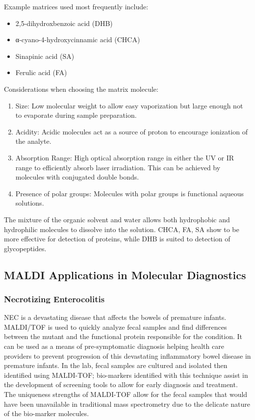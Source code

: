 \documentclass[letterpaper, 10 pt, conference]{ieeeconf}  %
\begin{document}
            Example matrices used most frequently include:
            \begin{itemize}
                \item{2,5-dihydroxbenzoic acid (DHB)}
                \item{α-cyano-4-hydroxycinnamic acid (CHCA)}
                \item{Sinapinic acid (SA)}
                \item{Ferulic acid (FA)}
            \end{itemize}
            Considerations when choosing the matrix molecule:
            \begin{enumerate}
                \item{Size: Low molecular weight to allow easy vaporization but large enough not to evaporate during sample preparation.}
                \item{Acidity: Acidic molecules act as a source of proton to encourage ionization   of the analyte.}
                \item{Absorption Range: High optical absorption range in either the UV or IR range  to efficiently absorb laser irradiation. This can be achieved by molecules     with conjugated double bonds.}
                \item{Presence of polar groups: Molecules with polar groups is functional aqueous solutions.}
            \end{enumerate}
            The mixture of the organic solvent and water allows both hydrophobic and hydrophilic molecules to dissolve into the solution. CHCA, FA, SA show to be more effective for detection of proteins, while DHB is suited to detection of glycopeptides.

        \subsection{\textbf{MALDI Applications in Molecular Diagnostics}}

            \subsubsection[\textbf{Nectrotizing Enterocolitits}]{\textbf{Necrotizing Enterocolitis}\autocite{R2}}\hfill \hfill

            NEC is a devastating disease that affects the bowels of premature infants. MALDI/TOF is used to quickly analyze fecal samples and find differences between the mutant and the functional protein responsible for the condition. It can be used as a means of pre-symptomatic diagnosis helping health care providers to prevent progression of this devastating inflammatory bowel disease in premature infants. In the lab, fecal samples are cultured and isolated then identified using MALDI-TOF; bio-markers identified with this technique assist in the development of screening tools to allow for early diagnosis and treatment. The uniqueness strengths of MALDI-TOF allow for the fecal samples that would have been unavailable in traditional mass spectrometry due to the delicate nature of the bio-marker molecules.
\end{document}
